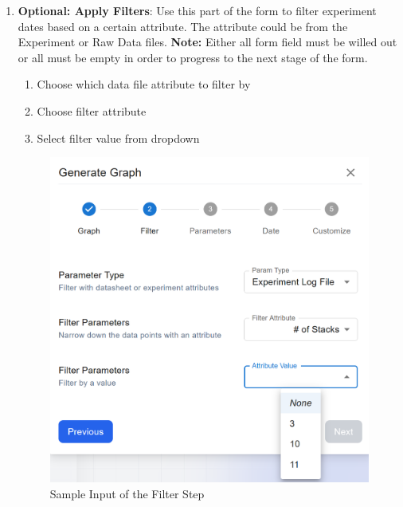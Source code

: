 \documentclass[12pt]{article}
\begin{document}
\begin{enumerate}
    \item \textbf{Optional: Apply Filters}: \newline
    Use this part of the form to filter experiment dates based on a certain
    attribute. The attribute could be from the Experiment or Raw Data files.
    \newline
    \textbf{Note:} Either all form field must be willed out or all must be empty in order
    to progress to the next stage of the form. 
    \begin{enumerate}
        \item Choose which data file attribute to filter by
        \item Choose filter attribute 
        \item Select filter value from dropdown
    \end{enumerate}
    \begin{figure}[H]
        \centering
        \includegraphics[scale=0.4]{./Diagrams/graph-filter.png}
        \caption{Sample Input of the Filter Step}
        \label{fig:example}
    \end{figure}
    

\end{enumerate}
\end{document}
